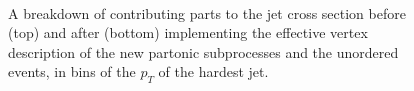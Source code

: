 \begin{figure}[H] 
\centering
{} \\
\caption{A breakdown of contributing parts to the jet cross section before (top) and after (bottom) implementing the effective vertex description of the new partonic subprocesses and the unordered events, in bins of the $p_T$ of the hardest jet.}
\label{fig:fklmigration2}
\end{figure}

